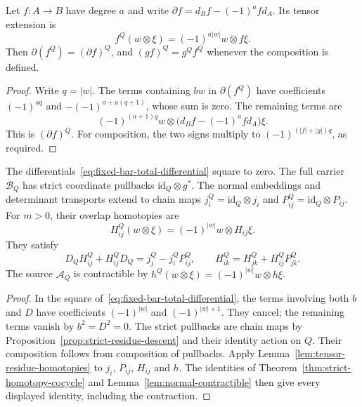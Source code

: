 \begin{lemma}
\label{lem:tensor-residue-homotopies}
Let $f:A\to B$ have degree $a$ and write
$\partial f=d_Bf-(-1)^a f d_A$.
Its tensor extension is
\[
f^Q(w\otimes\xi)=(-1)^{a|w|}w\otimes f\xi.
\]
Then $\partial(f^Q)=(\partial f)^Q$, and $(gf)^Q=g^Qf^Q$ whenever the composition is defined.
\end{lemma}

\begin{proof}
Write $q=|w|$.
The terms containing $bw$ in $\partial(f^Q)$ have coefficients
$(-1)^{aq}$ and $-(-1)^{a+a(q+1)}$, whose sum is zero.
The remaining terms are
\[
(-1)^{(a+1)q}w\otimes\bigl(d_Bf-(-1)^af d_A\bigr)\xi.
\]
This is $(\partial f)^Q$.
For composition, the two signs multiply to
$(-1)^{(|f|+|g|)q}$, as required.
\end{proof}

\begin{proposition}
\label{prop:bar-residue-descent}
The differentials~\eqref{eq:fixed-bar-total-differential} square to zero.
The full carrier $\mathcal B_Q$ has strict coordinate pullbacks
$\mathrm{id}_Q\otimes g^*$.
The normal embeddings and determinant transports extend to chain maps
$j_i^Q=\mathrm{id}_Q\otimes j_i$ and $P_{ij}^Q=\mathrm{id}_Q\otimes P_{ij}$.
For $m>0$, their overlap homotopies are
\begin{equation}
\label{eq:bar-overlap-homotopy}
H_{ij}^Q(w\otimes\xi)=(-1)^{|w|}w\otimes H_{ij}\xi.
\end{equation}
They satisfy
\[
D_QH_{ij}^Q+H_{ij}^QD_Q=j_j^Q-j_i^QP_{ij}^Q,
\qquad
H_{ik}^Q=H_{jk}^Q+H_{ij}^QP_{jk}^Q.
\]
The source $\mathcal A_Q$ is contractible by $h^Q(w\otimes\xi)=(-1)^{|w|}w\otimes h\xi$.
\end{proposition}

\begin{proof}
In the square of~\eqref{eq:fixed-bar-total-differential}, the terms involving both $b$ and $D$
have coefficients $(-1)^{|w|}$ and $(-1)^{|w|+1}$.
They cancel; the remaining terms vanish by $b^2=D^2=0$.
The strict pullbacks are chain maps by Proposition~\ref{prop:strict-residue-descent} and their identity action on $Q$.
Their composition follows from composition of pullbacks.
Apply Lemma~\ref{lem:tensor-residue-homotopies} to $j_i$, $P_{ij}$, $H_{ij}$ and $h$.
The identities of Theorem~\ref{thm:strict-homotopy-cocycle} and Lemma~\ref{lem:normal-contractible}
then give every displayed identity, including the contraction.
\end{proof}

